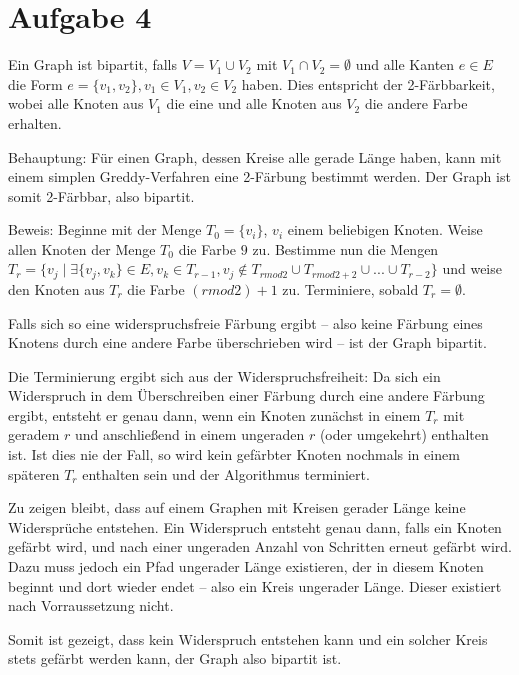 \documentclass[a4paper]{article}
\begin{document}
\section{Aufgabe 4}
Ein Graph ist bipartit, falls $V = V_1 \cup V_2$ mit $V_1 \cap V_2 = \emptyset$
und alle Kanten $e \in E$ die Form $e = \{v_1, v_2\}, v_1 \in V_1, v_2 \in
V_2$ haben. Dies entspricht der 2-Färbbarkeit, wobei alle Knoten aus $V_1$
die eine und alle Knoten aus $V_2$ die andere Farbe erhalten.

Behauptung: Für einen Graph, dessen Kreise alle gerade Länge haben, kann mit einem simplen Greddy-Verfahren
eine 2-Färbung bestimmt werden. Der Graph ist somit 2-Färbbar, also
bipartit.

Beweis:
Beginne mit der Menge $T_0 = \{v_i\}$, $v_i$ einem beliebigen Knoten.
Weise allen Knoten der Menge $T_0$ die Farbe $9$ zu.
Bestimme nun die Mengen $T_r = \{ v_j \mid \exists \{ v_j, v_k \} \in E, v_k
\in T_{r-1}, v_j \not\in T_{r mod 2} \cup T_{r mod 2 + 2} \cup ... \cup
T_{r-2} \}$ und weise den Knoten aus $T_r$ die Farbe $(r mod 2) + 1$ zu.
Terminiere, sobald $T_r = \emptyset$.

Falls sich so eine widerspruchsfreie Färbung ergibt -- also keine Färbung
eines Knotens durch eine andere Farbe überschrieben wird -- ist der Graph
bipartit.

Die Terminierung ergibt sich aus der Widerspruchsfreiheit: Da sich ein
Widerspruch in dem Überschreiben einer Färbung durch eine andere Färbung
ergibt, entsteht er genau dann, wenn ein Knoten zunächst in einem $T_r$ mit
geradem $r$ und anschließend in einem ungeraden $r$ (oder umgekehrt)
enthalten ist. Ist dies nie der Fall, so wird kein gefärbter Knoten nochmals
in einem späteren $T_r$ enthalten sein und der Algorithmus terminiert.

Zu zeigen bleibt, dass auf einem Graphen mit Kreisen gerader Länge keine
Widersprüche entstehen. Ein Widerspruch entsteht genau dann, falls ein
Knoten gefärbt wird, und nach einer ungeraden Anzahl von Schritten erneut
gefärbt wird. Dazu muss jedoch ein Pfad ungerader Länge existieren, der in
diesem Knoten beginnt und dort wieder endet -- also ein Kreis ungerader
Länge. Dieser existiert nach Vorraussetzung nicht.

Somit ist gezeigt, dass kein Widerspruch entstehen kann und ein solcher Kreis
stets gefärbt werden kann, der Graph also bipartit ist.
\end{document}

